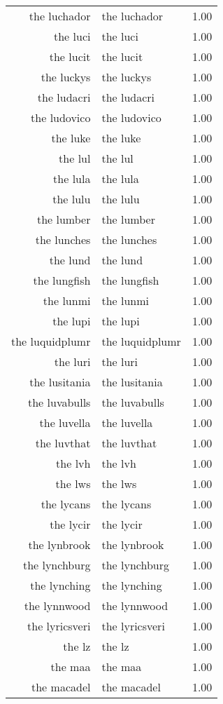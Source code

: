 \begin{table}[ht]
\begin{tabular}{rlr}
  the luchador & the luchador & 1.00 \\ 
  the luci & the luci & 1.00 \\ 
  the lucit & the lucit & 1.00 \\ 
  the luckys & the luckys & 1.00 \\ 
  the ludacri & the ludacri & 1.00 \\ 
  the ludovico & the ludovico & 1.00 \\ 
  the luke & the luke & 1.00 \\ 
  the lul & the lul & 1.00 \\ 
  the lula & the lula & 1.00 \\ 
  the lulu & the lulu & 1.00 \\ 
  the lumber & the lumber & 1.00 \\ 
  the lunches & the lunches & 1.00 \\ 
  the lund & the lund & 1.00 \\ 
  the lungfish & the lungfish & 1.00 \\ 
  the lunmi & the lunmi & 1.00 \\ 
  the lupi & the lupi & 1.00 \\ 
  the luquidplumr & the luquidplumr & 1.00 \\ 
  the luri & the luri & 1.00 \\ 
  the lusitania & the lusitania & 1.00 \\ 
  the luvabulls & the luvabulls & 1.00 \\ 
  the luvella & the luvella & 1.00 \\ 
  the luvthat & the luvthat & 1.00 \\ 
  the lvh & the lvh & 1.00 \\ 
  the lws & the lws & 1.00 \\ 
  the lycans & the lycans & 1.00 \\ 
  the lycir & the lycir & 1.00 \\ 
  the lynbrook & the lynbrook & 1.00 \\ 
  the lynchburg & the lynchburg & 1.00 \\ 
  the lynching & the lynching & 1.00 \\ 
  the lynnwood & the lynnwood & 1.00 \\ 
  the lyricsveri & the lyricsveri & 1.00 \\ 
  the lz & the lz & 1.00 \\ 
  the maa & the maa & 1.00 \\ 
  the macadel & the macadel & 1.00 \\ 

\end{tabular}
\end{table}

